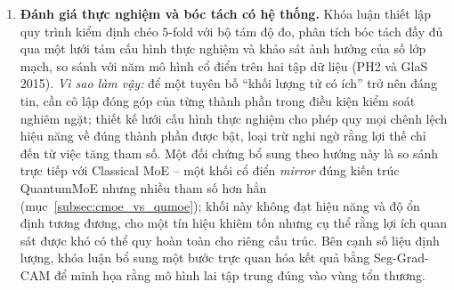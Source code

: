 \begin{enumerate}
    \item \textbf{Đánh giá thực nghiệm và bóc tách có hệ thống.} Khóa luận thiết lập quy trình kiểm định chéo $5$-fold với bộ tám độ đo, phân tích bóc tách đầy đủ qua một lưới tám cấu hình thực nghiệm và khảo sát ảnh hưởng của số lớp mạch, so sánh với năm mô hình cổ điển trên hai tập dữ liệu (PH2 và GlaS 2015). \emph{Vì sao làm vậy:} để một tuyên bố ``khối lượng tử có ích'' trở nên đáng tin, cần cô lập đóng góp của từng thành phần trong điều kiện kiểm soát nghiêm ngặt; thiết kế lưới cấu hình thực nghiệm cho phép quy mọi chênh lệch hiệu năng về đúng thành phần được bật, loại trừ nghi ngờ rằng lợi thế chỉ đến từ việc tăng tham số. Một đối chứng bổ sung theo hướng này là so sánh trực tiếp với Classical MoE -- một khối cổ điển \emph{mirror} đúng kiến trúc QuantumMoE nhưng nhiều tham số hơn hẳn (mục~\ref{subsec:cmoe_vs_qumoe}); khối này không đạt hiệu năng và độ ổn định tương đương, cho một tín hiệu khiêm tốn nhưng cụ thể rằng lợi ích quan sát được khó có thể quy hoàn toàn cho riêng cấu trúc. Bên cạnh số liệu định lượng, khóa luận bổ sung một bước trực quan hóa kết quả bằng Seg-Grad-CAM để minh họa rằng mô hình lai tập trung đúng vào vùng tổn thương.
\end{enumerate}

